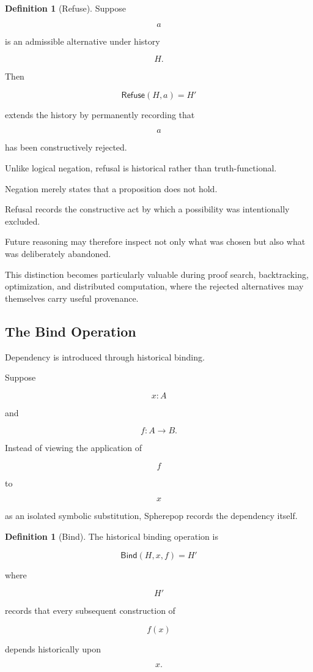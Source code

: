 \documentclass[12pt,oneside]{article}
\theoremstyle{definition}
\newtheorem{definition}[theorem]{Definition}
\theoremstyle{remark}
\newcommand{\Refuse}{\mathsf{Refuse}}
\newcommand{\Bind}{\mathsf{Bind}}
\begin{document}
\begin{definition}[Refuse]

Suppose

\[
a
\]

is an admissible alternative under history

\[
H.
\]

Then

\[
\Refuse(H,a)
=
H'
\]

extends the history by permanently recording that

\[
a
\]

has been constructively rejected.

\end{definition}

Unlike logical negation, refusal is historical rather than truth-functional.

Negation merely states that a proposition does not hold.

Refusal records the constructive act by which a possibility was intentionally
excluded.

Future reasoning may therefore inspect not only what was chosen but also what
was deliberately abandoned.

This distinction becomes particularly valuable during proof search,
backtracking, optimization, and distributed computation, where the rejected
alternatives may themselves carry useful provenance.

\subsection{The Bind Operation}

Dependency is introduced through historical binding.

Suppose

\[
x:A
\]

and

\[
f:A\rightarrow B.
\]

Instead of viewing the application of

\[
f
\]

to

\[
x
\]

as an isolated symbolic substitution, Spherepop records the dependency itself.

\begin{definition}[Bind]

The historical binding operation is

\[
\Bind(H,x,f)
=
H'
\]

where

\[
H'
\]

records that every subsequent construction of

\[
f(x)
\]

depends historically upon

\[
x.
\]

\end{definition}
\end{document}
